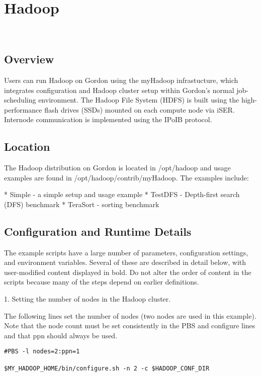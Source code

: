 \section{Hadoop}
\FILENAME\

\subsection{Overview}

Users can run Hadoop on Gordon using the myHadoop infrastucture, which
integrates configuration and Hadoop cluster setup within Gordon's
normal job-scheduling environment. The Hadoop File System (HDFS) is
built using the high-performance flash drives (SSDs) mounted on each
compute node via iSER. Internode communication is implemented using
the IPoIB protocol.

\subsection{Location}

The Hadoop distribution on Gordon is located in /opt/hadoop and usage
examples are found in /opt/hadoop/contrib/myHadoop. The examples
include:

* Simple - a simple setup and usage example
* TestDFS - Depth-first search (DFS) benchmark
* TeraSort - sorting benchmark

\subsection{Configuration and Runtime Details}

The example scripts have a large number of parameters, configuration
settings, and environment variables. Several of these are described in
detail below, with user-modified content displayed in bold. Do not
alter the order of content in the scripts because many of the steps
depend on earlier definitions.

1. Setting the number of nodes in the Hadoop cluster.

The following lines set the number of nodes (two nodes are used in
this example). Note that the node count must be set consistently in
the PBS and configure lines and that ppn should always be used.

\begin{verbatim}
#PBS -l nodes=2:ppn=1

$MY_HADOOP_HOME/bin/configure.sh -n 2 -c $HADOOP_CONF_DIR
\end{verbatim}

